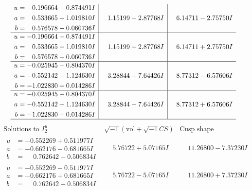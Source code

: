 \documentclass[1p]{elsarticle_modified}
\theoremstyle{definition}
\newcommand{\I}{\sqrt{-1}}
\begin{document}
$$\begin{array}{c|c|c}
\begin{aligned}
u &= -0.196664 + 0.874491 I \\
a &= \phantom{-}0.533665 + 1.019810 I \\
b &= \phantom{-}0.576578 - 0.060736 I\end{aligned}
 & \phantom{-}1.15199 + 2.87768 I & \phantom{-}6.14711 - 2.75750 I \\ \hline\begin{aligned}
u &= -0.196664 - 0.874491 I \\
a &= \phantom{-}0.533665 - 1.019810 I \\
b &= \phantom{-}0.576578 + 0.060736 I\end{aligned}
 & \phantom{-}1.15199 - 2.87768 I & \phantom{-}6.14711 + 2.75750 I \\ \hline\begin{aligned}
u &= -0.025945 + 0.804370 I \\
a &= -0.552142 - 1.124630 I \\
b &= -1.022830 + 0.014286 I\end{aligned}
 & \phantom{-}3.28844 + 7.64426 I & \phantom{-}8.77312 - 6.57606 I \\ \hline\begin{aligned}
u &= -0.025945 - 0.804370 I \\
a &= -0.552142 + 1.124630 I \\
b &= -1.022830 - 0.014286 I\end{aligned}
 & \phantom{-}3.28844 - 7.64426 I & \phantom{-}8.77312 + 6.57606 I\\
 \hline 
 \end{array}$$\newpage$$\begin{array}{c|c|c}  
\text{Solutions to }I^u_{2}& \I (\text{vol} + \sqrt{-1}CS) & \text{Cusp shape}\\
 \hline 
\begin{aligned}
u &= -0.552269 + 0.511977 I \\
a &= -0.662176 - 0.681665 I \\
b &= \phantom{-}0.762642 + 0.506834 I\end{aligned}
 & \phantom{-}5.76722 + 5.07165 I & \phantom{-}11.26800 - 7.37230 I \\ \hline\begin{aligned}
u &= -0.552269 - 0.511977 I \\
a &= -0.662176 + 0.681665 I \\
b &= \phantom{-}0.762642 - 0.506834 I\end{aligned}
 & \phantom{-}5.76722 - 5.07165 I & \phantom{-}11.26800 + 7.37230 I \\ \hline\begin{aligned}

\end{aligned}
\end{array}$$
\end{document}
